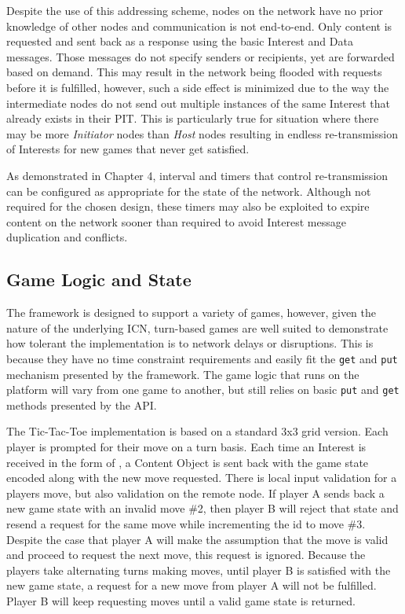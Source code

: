 \documentclass[a4paper,12pt]{report}      %
\begin{document}
Despite the use of this addressing scheme, nodes on the network have no prior knowledge of other
nodes and communication is not end-to-end. Only content is requested and sent back
as a response using the basic Interest and Data messages. Those messages do not specify senders or
recipients, yet are forwarded based on demand. This may result in the network being flooded with
requests before it is fulfilled, however, such a side effect is minimized due to the way the intermediate
nodes do not send out multiple instances of the same Interest that already exists in their PIT. This is
particularly true for situation where there may be more \emph{Initiator} nodes than \emph{Host} nodes resulting in
endless re-transmission of Interests for new games that never get satisfied.

As demonstrated in Chapter 4, interval and timers that control re-transmission can be configured as
appropriate for the state of the network. Although not required for the chosen design, these timers may
also be exploited to expire content on the network sooner than required to avoid Interest message
duplication and conflicts.

\subsection{Game Logic and State}

The framework is designed to support a variety of games, however, given the nature of the underlying
ICN, turn-based games are well suited to demonstrate how tolerant the implementation is
to network delays or disruptions. This is because they have no time constraint requirements and easily fit the
\verb!get! and \verb!put! mechanism presented by the framework. The game logic that runs on the platform will vary
 from one game to another, but still relies on basic \verb!put! and \verb!get! methods presented by the API.

The Tic-Tac-Toe implementation is based on a standard 3x3 grid version. Each player is prompted for
their move on a turn basis. Each time an Interest is received in the form of
\texttt{}, a Content Object is sent back with the game state
encoded along with the new move requested. There is local input validation for a players move, but
also validation on the remote node. If player A sends back a new game state with an invalid move \#2,
then player B will reject that state and resend a request for the same move while incrementing the id to move \#3. 
Despite the case that player A will make the assumption that the move is valid and proceed to request the next move, 
this request is ignored. Because the players take alternating turns making moves, until player B is satisfied with the new game state, a
request for a new move from player A will not be fulfilled. Player B will keep requesting moves until a
valid game state is returned.
\end{document}
